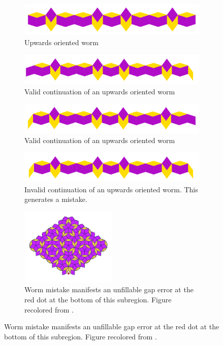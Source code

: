 \documentclass[
  oneside,
  11pt, a4paper,
  footinclude=true,
  headinclude=true,
  cleardoublepage=empty
]{scrbook}
\begin{document}
\begin{figure}[H]
\centering
\begin{subfigure}{\textwidth}
\centering
\includegraphics[width=\textwidth]{ValidWorm0}
\caption{Upwards oriented worm}
\end{subfigure}

\begin{subfigure}{\textwidth}
\centering
\includegraphics[width=\textwidth]{ValidWorm1}
\caption{Valid continuation of an upwards oriented worm}
\end{subfigure}

\begin{subfigure}{\textwidth}
\centering
\includegraphics[width=\textwidth]{ValidWorm2}
\caption{Valid continuation of an upwards oriented worm}
\end{subfigure}

\begin{subfigure}{\textwidth}
\centering
\includegraphics[width=\textwidth]{InvalidWorm}
\caption{Invalid continuation of an upwards oriented worm. This generates a mistake.}
\end{subfigure}

\begin{subfigure}{\textwidth}
\centering
\includegraphics[width=0.5\textwidth]{illegal}
\caption{Worm mistake manifests an unfillable gap error at the red dot at the bottom of this subregion. Figure recolored from \cite{Austin2007}.}
\end{subfigure}


\end{figure}
\end{document}
